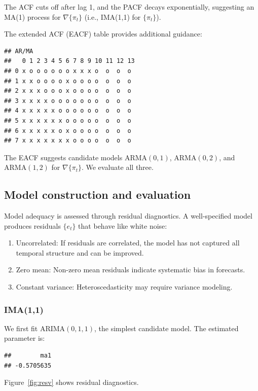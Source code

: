 \documentclass[final,11pt]{article}
\theoremstyle{plain}
\theoremstyle{remark}
\begin{document}
The ACF cuts off after lag 1, and the PACF decays exponentially,
suggesting an MA(1) process for $\nabla\{\pi_t\}$ (i.e., IMA(1,1) for
$\{\pi_t\}$).

The extended ACF (EACF) table provides additional guidance:

\begin{verbatim}
## AR/MA
##   0 1 2 3 4 5 6 7 8 9 10 11 12 13
## 0 x o o o o o o x x x o  o  o  o
## 1 x x o o o o x o o o o  o  o  o
## 2 x x x o o o x o o o o  o  o  o
## 3 x x x x o o o o o o o  o  o  o
## 4 x x x x x o o o o o o  o  o  o
## 5 x x x x x x o o o o o  o  o  o
## 6 x x x x x o x o o o o  o  o  o
## 7 x x x x x x x o o o o  o  o  o
\end{verbatim}

The EACF suggests candidate models ARMA$(0,1)$, ARMA$(0,2)$, and
ARMA$(1,2)$ for $\nabla\{\pi_t\}$. We evaluate all three.

\hypertarget{model-construction-and-evaluation}{%
\subsection{Model construction and
evaluation}\label{model-construction-and-evaluation}}

Model adequacy is assessed through residual diagnostics. A well-specified
model produces residuals $\{e_t\}$ that behave like white noise:
\begin{enumerate}
\item Uncorrelated: If residuals are correlated, the model has not captured
all temporal structure and can be improved.
\item Zero mean: Non-zero mean residuals indicate systematic bias in forecasts.
\item Constant variance: Heteroscedasticity may require variance modeling.
\end{enumerate}

\hypertarget{ima11}{%
\subsubsection{IMA(1,1)}\label{ima11}}

We first fit ARIMA$(0,1,1)$, the simplest candidate model. The estimated
parameter is:

\begin{verbatim}
##        ma1
## -0.5705635
\end{verbatim}

Figure~\ref{fig:resv} shows residual diagnostics.
\end{document}
